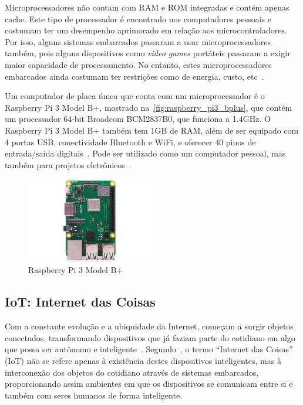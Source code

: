 Microprocessadores não contam com RAM e ROM integradas e contém apenas cache. Este tipo de processador é encontrado nos computadores pessoais e costumam ter um desempenho aprimorado em relação aos microcontroladores. Por isso, alguns sistemas embarcados passaram a usar microprocessadores também, pois alguns dispositivos como \textit{video games} portáteis passaram a exigir maior capacidade de processamento. No entanto, estes microprocessadores embarcados ainda costumam ter restrições como de energia, custo, etc~\cite{schlett:1998}.

Um computador de placa única que conta com um microprocessador é o Raspberry Pi 3 Model B+, mostrado na~\autoref{fig:raspberry_pi3_bplus}, que contém um processador 64-bit Broadcom BCM2837B0, que funciona a 1.4GHz. O Raspberry Pi 3 Model B+ também tem 1GB de RAM, além de ser equipado com 4 portas USB, conectividade Bluetooth e WiFi, e oferecer 40 pinos de entrada/saída digitais~\cite{raspberry:pi3_store}. Pode ser utilizado como um computador pessoal, mas também para projetos eletrônicos~\cite{raspberry:faq}.

\begin{figure}[ht]
	\caption{\label{fig:raspberry_pi3_bplus}Raspberry Pi 3 Model B+}
	\begin{center}
	    \includegraphics[width=0.5\textwidth]{resources/raspberry_pi3_bplus}
	\end{center}
\end{figure}

\subsection{\texorpdfstring{IoT\@:}{IoT:} Internet das Coisas}
Com a constante evolução e a ubiquidade da Internet, começam a surgir objetos conectados, transformando dispositivos que já faziam parte do cotidiano em algo que possa ser autônomo e inteligente~\cite{kopetz:2011}.  Segundo~, o termo ``Internet das Coisas'' (IoT)  não se refere apenas à existência destes dispositivos inteligentes, mas à interconexão dos objetos do cotidiano através de sistemas embarcados, proporcionando assim ambientes em que os dispositivos se comunicam entre si e também com seres humanos de forma inteligente.

